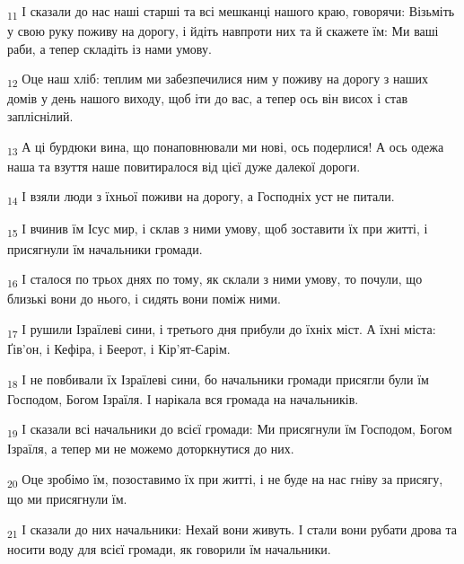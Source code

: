 \begin{tcolorbox}
\textsubscript{11} І сказали до нас наші старші та всі мешканці нашого краю, говорячи: Візьміть у свою руку поживу на дорогу, і йдіть навпроти них та й скажете їм: Ми ваші раби, а тепер складіть із нами умову.
\end{tcolorbox}
\begin{tcolorbox}
\textsubscript{12} Оце наш хліб: теплим ми забезпечилися ним у поживу на дорогу з наших домів у день нашого виходу, щоб іти до вас, а тепер ось він висох і став запліснілий.
\end{tcolorbox}
\begin{tcolorbox}
\textsubscript{13} А ці бурдюки вина, що понаповнювали ми нові, ось подерлися! А ось одежа наша та взуття наше повитиралося від цієї дуже далекої дороги.
\end{tcolorbox}
\begin{tcolorbox}
\textsubscript{14} І взяли люди з їхньої поживи на дорогу, а Господніх уст не питали.
\end{tcolorbox}
\begin{tcolorbox}
\textsubscript{15} І вчинив їм Ісус мир, і склав з ними умову, щоб зоставити їх при житті, і присягнули їм начальники громади.
\end{tcolorbox}
\begin{tcolorbox}
\textsubscript{16} І сталося по трьох днях по тому, як склали з ними умову, то почули, що близькі вони до нього, і сидять вони поміж ними.
\end{tcolorbox}
\begin{tcolorbox}
\textsubscript{17} І рушили Ізраїлеві сини, і третього дня прибули до їхніх міст. А їхні міста: Ґів'он, і Кефіра, і Беерот, і Кір'ят-Єарім.
\end{tcolorbox}
\begin{tcolorbox}
\textsubscript{18} І не повбивали їх Ізраїлеві сини, бо начальники громади присягли були їм Господом, Богом Ізраїля. І нарікала вся громада на начальників.
\end{tcolorbox}
\begin{tcolorbox}
\textsubscript{19} І сказали всі начальники до всієї громади: Ми присягнули їм Господом, Богом Ізраїля, а тепер ми не можемо доторкнутися до них.
\end{tcolorbox}
\begin{tcolorbox}
\textsubscript{20} Оце зробімо їм, позоставимо їх при житті, і не буде на нас гніву за присягу, що ми присягнули їм.
\end{tcolorbox}
\begin{tcolorbox}
\textsubscript{21} І сказали до них начальники: Нехай вони живуть. І стали вони рубати дрова та носити воду для всієї громади, як говорили їм начальники.
\end{tcolorbox}
